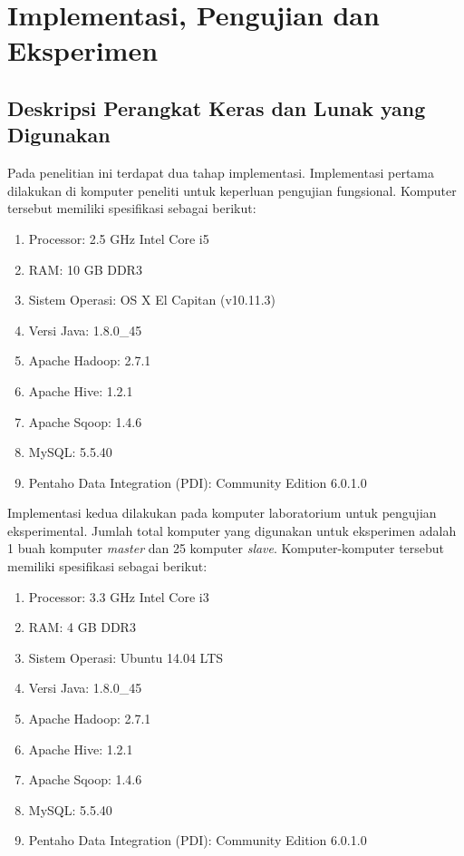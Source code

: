 \chapter{Implementasi, Pengujian dan Eksperimen}
\section{Deskripsi Perangkat Keras dan Lunak yang Digunakan}
\label{sec:deskripsi_perangkat_keras}
Pada penelitian ini terdapat dua tahap implementasi. Implementasi pertama dilakukan di komputer peneliti untuk keperluan pengujian fungsional. Komputer tersebut memiliki spesifikasi sebagai berikut:

\begin{enumerate}
	\item Processor: 2.5 GHz Intel Core i5
	\item RAM: 10 GB DDR3
	\item Sistem Operasi: OS X El Capitan (v10.11.3)
	\item Versi Java: 1.8.0\_45
	\item Apache Hadoop: 2.7.1
	\item Apache Hive: 1.2.1
	\item Apache Sqoop: 1.4.6
	\item MySQL: 5.5.40
	\item Pentaho Data Integration (PDI): Community Edition 6.0.1.0
\end{enumerate}

Implementasi kedua dilakukan pada komputer laboratorium untuk pengujian eksperimental. Jumlah total komputer yang digunakan untuk eksperimen adalah 1 buah komputer \textit{master} dan 25 komputer \textit{slave}. Komputer-komputer tersebut memiliki spesifikasi sebagai berikut:
\begin{enumerate}
	\item Processor: 3.3 GHz Intel Core i3
	\item RAM: 4 GB DDR3
	\item Sistem Operasi: Ubuntu 14.04 LTS
	\item Versi Java: 1.8.0\_45
	\item Apache Hadoop: 2.7.1
	\item Apache Hive: 1.2.1
	\item Apache Sqoop: 1.4.6
	\item MySQL: 5.5.40
	\item Pentaho Data Integration (PDI): Community Edition 6.0.1.0
\end{enumerate}

